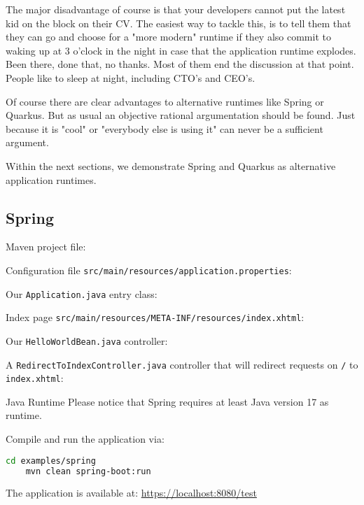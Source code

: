 The major disadvantage of course is that your developers cannot put the latest kid on the block on their CV.
The easiest way to tackle this,
is to tell them that they can go and choose for a "more modern" runtime if they also commit to waking up at 3 o'clock in the night in case that the application runtime explodes.
Been there, done that, no thanks.
Most of them end the discussion at that point.
People like to sleep at night, including CTO's and CEO's.

Of course there are clear advantages to alternative runtimes like Spring or Quarkus.
But as usual an objective rational argumentation should be found.
Just because it is "cool" or "everybody else is using it" can never be a sufficient argument.

Within the next sections, we demonstrate Spring and Quarkus as alternative application runtimes.

\subsection{Spring}

Maven project file:


Configuration file \texttt{src/main/resources/application.properties}:


Our \texttt{Application.java} entry class:


Index page \texttt{src/main/resources/META-INF/resources/index.xhtml}:


Our \texttt{HelloWorldBean.java} controller:


A \texttt{RedirectToIndexController.java} controller that will redirect requests on \texttt{/} to \texttt{index.xhtml}:


\begin{TIP}{Java Runtime}
	Please notice that Spring requires at least Java version 17 as runtime.
\end{TIP}

Compile and run the application via:
\begin{lstlisting}[language=bash]
	cd examples/spring
	mvn clean spring-boot:run
\end{lstlisting}
The application is available at:
\url{https://localhost:8080/test}



